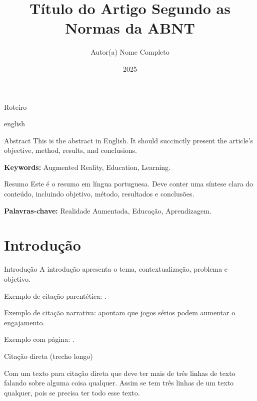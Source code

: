 \documentclass[aspectratio=169]{beamer}
\title{Título do Artigo Segundo as Normas da ABNT}
\author{Autor(a) Nome Completo}
\institute{Instituição\\ \href{mailto:autor@exemplo.com}{autor@exemplo.com}}
\date{2025}
\begin{document}
\begin{frame}
  \titlepage
\end{frame}

\begin{frame}{Roteiro}
  \tableofcontents
\end{frame}

\begin{otherlanguage*}{english}
\begin{frame}{Abstract}
This is the abstract in English. It should succinctly present the article’s
objective, method, results, and conclusions.

\medskip
\textbf{Keywords:} Augmented Reality, Education, Learning.
\end{frame}
\end{otherlanguage*}

\begin{frame}{Resumo}
Este é o resumo em língua portuguesa. Deve conter uma síntese clara do conteúdo,
incluindo objetivo, método, resultados e conclusões.

\medskip
\textbf{Palavras-chave:} Realidade Aumentada, Educação, Aprendizagem.
\end{frame}

\section{Introdução}

\begin{frame}{Introdução}
A introdução apresenta o tema, contextualização, problema e objetivo.

Exemplo de citação parentética: \parencite{albuquerqueToyUserInterfaces2021}.

Exemplo de citação narrativa: \textcite{aragaoEnsinoProgramacaoPensamento2023}
apontam que jogos sérios podem aumentar o engajamento.

Exemplo com página: \parencite[p.~25]{azumaRecentAdvancesAugmentedReality2001}.
\end{frame}

\begin{frame}{Citação direta (trecho longo)}
\small
\begin{displayquote}
Com um texto para citação direta que deve ter mais de três linhas de texto
falando sobre alguma coisa qualquer. Assim se tem três linhas de um texto
qualquer, pois se precisa ter todo esse texto.
\end{displayquote}
\end{frame}
\end{document}
